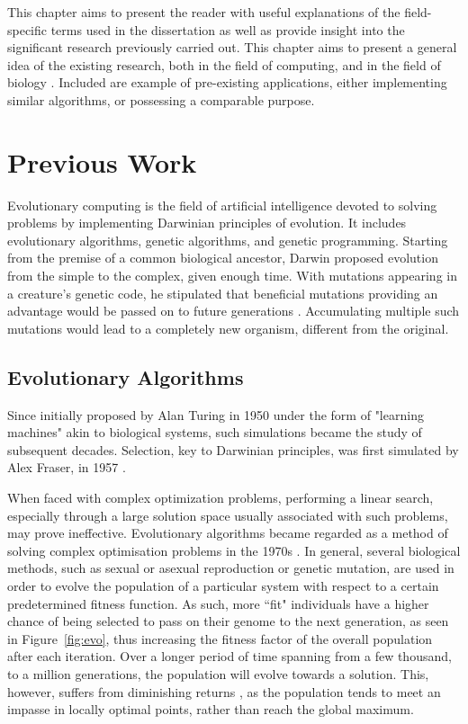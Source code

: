 This chapter aims to present the reader with useful explanations of the field-specific terms used in the dissertation as well as provide insight into the significant research previously carried out. This chapter aims to present a general idea of the existing research, both in the field of computing, and in the field of biology . Included are example of pre-existing applications, either implementing similar algorithms, or possessing a comparable purpose.

\section{Previous Work} \label{prevwork}
Evolutionary computing is the field of artificial intelligence devoted to solving problems by implementing Darwinian principles of evolution. It includes evolutionary algorithms, genetic algorithms, and genetic programming. Starting from the premise of a common biological ancestor, Darwin proposed evolution from the simple to the complex, given enough time. With mutations appearing in a creature's genetic code, he stipulated that beneficial mutations providing an advantage would be passed on to future generations \cite{darwinbook1859}. Accumulating multiple such mutations would lead to a completely new organism, different from the original.

\subsection{Evolutionary Algorithms}
Since initially proposed by Alan Turing in 1950 under the form of "learning machines" \cite{turing1950computing} akin to biological systems, such simulations became the study of subsequent decades. Selection, key to Darwinian principles, was first simulated by Alex Fraser, in 1957 \cite{fraser1960simulation}.

When faced with complex optimization problems, performing a linear search, especially through a large solution space usually associated with such problems, may prove ineffective. Evolutionary algorithms became regarded as a method of solving complex optimisation problems in the 1970s \cite{holland1975adaptation}. In general, several biological methods, such as sexual or asexual reproduction or genetic mutation, are used in order to evolve the population of a particular system with respect to a certain predetermined fitness function. As such, more ``fit" individuals have a higher chance of being selected to pass on their genome to the next generation, as seen in Figure~\ref{fig:evo}, thus increasing the fitness factor of the overall population after each iteration. Over a longer period of time spanning from a few thousand, to a million generations, the population will evolve towards a solution. This, however, suffers from diminishing returns \cite{fumagalli2015speed}, as the population tends to meet an impasse in locally optimal points, rather than reach the global maximum.

